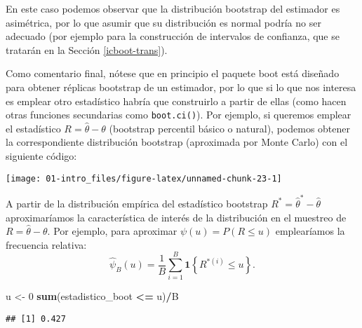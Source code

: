\documentclass[
]{book}
\newenvironment{Shaded}{\begin{snugshade}}{\end{snugshade}}
\newcommand{\DecValTok}[1]{\textcolor[rgb]{0.00,0.00,0.81}{#1}}
\newcommand{\KeywordTok}[1]{\textcolor[rgb]{0.13,0.29,0.53}{\textbf{#1}}}
\newcommand{\NormalTok}[1]{#1}
\newcommand{\OperatorTok}[1]{\textcolor[rgb]{0.81,0.36,0.00}{\textbf{#1}}}
\newcommand{\StringTok}[1]{\textcolor[rgb]{0.31,0.60,0.02}{#1}}
\theoremstyle{break}
\theoremstyle{definition}
\theoremstyle{definition}
\theoremstyle{definition}
\theoremstyle{remark}
\begin{document}
En este caso podemos observar que la distribución bootstrap del estimador es asimétrica, por lo que asumir que su distribución es normal podría no ser adecuado (por ejemplo para la construcción de intervalos de confianza, que se tratarán en la Sección \ref{icboot-trans}).

Como comentario final, nótese que en principio el paquete boot está diseñado para obtener réplicas bootstrap de un estimador, por lo que si lo que nos interesa es emplear otro estadístico habría que construirlo a partir de ellas (como hacen otras funciones secundarias como \texttt{boot.ci()}).
Por ejemplo, si queremos emplear el estadístico \(R = \hat \theta - \theta\)
(bootstrap percentil básico o natural), podemos obtener la correspondiente distribución bootstrap (aproximada por Monte Carlo) con el siguiente código:

\begin{Shaded}
\end{Shaded}

\begin{center}\texttt{[image: 01-intro\_files/figure-latex/unnamed-chunk-23-1]} \end{center}

A partir de la distribución empírica del estadístico bootstrap \(R^{\ast} = \hat \theta^{\ast} - \hat \theta\) aproximaríamos la característica de interés de la distribución en el muestreo de \(R = \hat \theta - \theta\).
Por ejemplo, para aproximar \(\psi \left( u \right) =P\left( R\leq u \right)\) emplearíamos la frecuencia relativa:
\[\hat{\psi}_{B}\left( u \right) =
\frac{1}{B}\sum_{i=1}^{B}\mathbf{1}\left\{ R^{\ast (i)}\leq u\right\}.\]

\begin{Shaded}
\begin{Highlighting}[]
\NormalTok{u <-}\StringTok{ }\DecValTok{0}
\KeywordTok{sum}\NormalTok{(estadistico_boot }\OperatorTok{<=}\StringTok{ }\NormalTok{u)}\OperatorTok{/}\NormalTok{B}
\end{Highlighting}
\end{Shaded}

\begin{verbatim}
## [1] 0.427
\end{verbatim}
\end{document}
